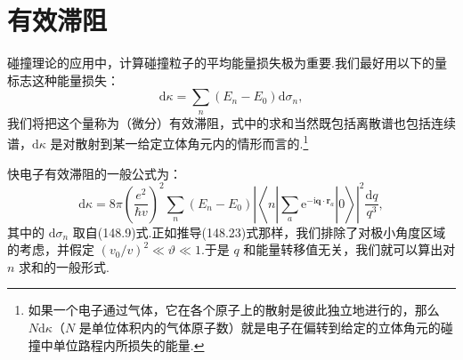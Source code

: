 \section{有效滞阻}

碰撞理论的应用中，计算碰撞粒子的平均能量损失极为重要.我们最好用以下的量标志这种能量损失：
\begin{equation}
  \mathrm{d}\kappa=\sum_n\left(E_n-E_0\right)\mathrm{d}\sigma_n,
\end{equation}
我们将把这个量称为（微分）有效滞阻，式中的求和当然既包括离散谱也包括连续谱，$\mathrm{d}\kappa$ 是对散射到某一给定立体角元内的情形而言的.\footnote{如果一个电子通过气体，它在各个原子上的散射是彼此独立地进行的，那么 $N\mathrm{d}\kappa$（$N$ 是单位体积内的气体原子数）就是电子在偏转到给定的立体角元的碰撞中单位路程内所损失的能量.}

快电子有效滞阻的一般公式为：
\begin{equation}
  \mathrm{d}\kappa=8\pi\left(\frac{e^2}{\hbar v}\right)^2\sum_n\left(E_n-E_0\right)
  \left|\left\langle n\left|\sum_a\mathrm{e}^{-\mathrm{i}\boldsymbol{q}\cdot\boldsymbol{r}_a}\right|0\right\rangle\right|^2
  \frac{\mathrm{d}q}{q^3},
\end{equation}
其中的 $\mathrm{d}\sigma_n$ 取自(148.9)式.正如推导(148.23)式那样，我们排除了对极小角度区域的考虑，并假定 $(v_0/v)^2\ll\vartheta\ll1$.于是 $q$ 和能量转移值无关，我们就可以算出对 $n$ 求和的一般形式.

